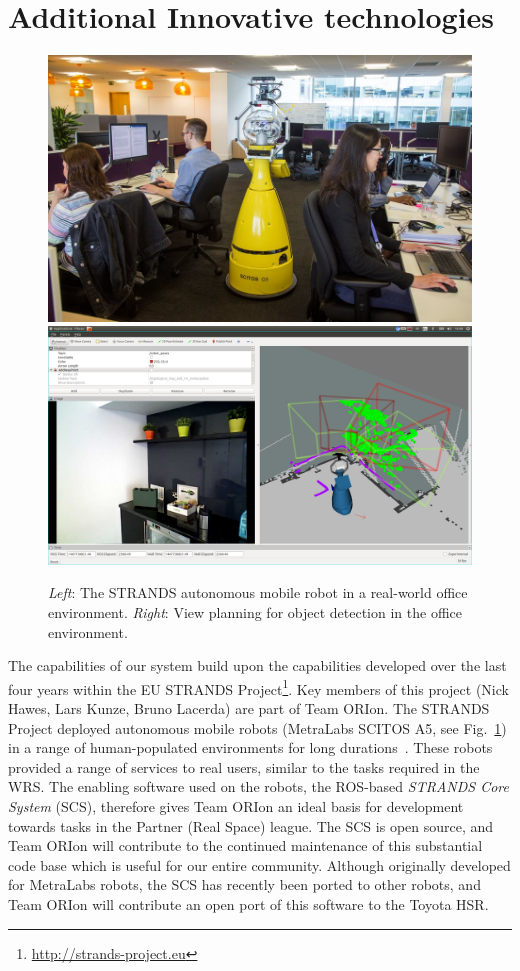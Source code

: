 \documentclass[runningheads,a4paper]{llncs}
\newcommand{\teamori}{Team ORIon}
\begin{document}
\section{Additional Innovative technologies}
\begin{figure}[tb]
  \begin{center}
    \includegraphics[width=.43\columnwidth]{images/betty.jpg}
    \includegraphics[width=.55\columnwidth,clip,trim=10ex 20ex 10ex 20ex]{images/viewplanning_at_tsc.png}
  \end{center} 
  \vspace{-10pt}  
  \caption{\textit{Left}: The STRANDS autonomous mobile robot in a real-world
  office environment. \textit{Right}: View planning for object detection in the
  office environment.}
  \label{fig:mk}
  \vspace{-3ex}
\end{figure}

The capabilities of our system build upon the capabilities developed over the last four years within the EU STRANDS Project\footnote{\url{http://strands-project.eu}}. Key members of this project (Nick Hawes, Lars Kunze, Bruno Lacerda) are part of \teamori. The STRANDS Project deployed autonomous mobile robots (MetraLabs SCITOS A5, see Fig.~\ref{fig:mk}) in a range of human-populated environments for long durations~\cite{strands@ram}. These robots provided a range of services to real users, similar to the tasks required in the WRS. The enabling software used on the robots, the ROS-based \emph{STRANDS Core System} (SCS), therefore gives \teamori{} an ideal basis for development towards tasks in the Partner (Real Space) league. The SCS is open source, and \teamori{} will contribute to the continued maintenance of this substantial code base which is useful for our entire community. Although originally developed for MetraLabs robots, the SCS has recently been ported to other robots, and \teamori{} will contribute an open port of this software to the Toyota HSR. 
\end{document}
